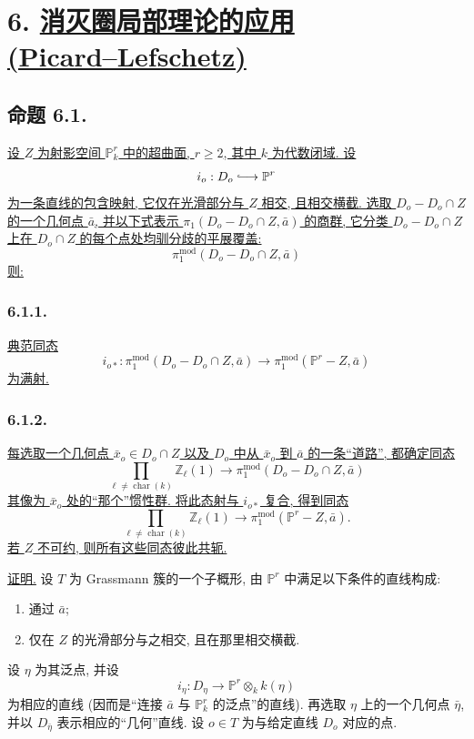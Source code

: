 \section*{6. \underline{消灭圈局部理论的应用}\\
\underline{(Picard--Lefschetz)}}

\subsection*{命题 6.1.}
\underline{设 $Z$ 为射影空间 $\mathbb P^r_k$ 中的超曲面, $r\geq2$, 其中 $k$ 为代数闭域. 设}
\[
i_o:D_o\lhook\joinrel\longrightarrow\mathbb P^r
\]
\underline{为一条直线的包含映射, 它仅在光滑部分与 $Z$ 相交, 且相交横截. 选取 $D_o-D_o\cap Z$ 的一个几何点 $\bar a$, 并以下式表示 $\pi_1(D_o-D_o\cap Z,\bar a)$ 的商群, 它分类 $D_o-D_o\cap Z$ 上在 $D_o\cap Z$ 的每个点处均驯分歧的平展覆盖:}
\[
\pi_1^{\mathrm{mod}}(D_o-D_o\cap Z,\bar a)
\]
\underline{则:}

\subsubsection*{6.1.1.}
\underline{典范同态}
\begin{equation}\tag{6.1.1.1}
i_{o*}:\pi_1^{\mathrm{mod}}(D_o-D_o\cap Z,\bar a)
\longrightarrow
\pi_1^{\mathrm{mod}}(\mathbb P^r-Z,\bar a)
\end{equation}
\underline{为满射.}

\subsubsection*{6.1.2.}
\underline{每选取一个几何点 $\bar x_o\in D_o\cap Z$ 以及 $D_o$ 中从 $\bar x_o$ 到 $\bar a$ 的一条“道路”, 都确定同态}
\begin{equation}\tag{6.1.2.1}
\prod_{\ell\ne\operatorname{char}(k)}\mathbb Z_\ell(1)
\longrightarrow
\pi_1^{\mathrm{mod}}(D_o-D_o\cap Z,\bar a)
\end{equation}
\underline{其像为 $\bar x_o$ 处的“那个”惯性群. 将此态射与 $i_{o*}$ 复合, 得到同态}
\begin{equation}\tag{6.1.2.2}
\prod_{\ell\ne\operatorname{char}(k)}\mathbb Z_\ell(1)
\longrightarrow
\pi_1^{\mathrm{mod}}(\mathbb P^r-Z,\bar a).
\end{equation}
\underline{若 $Z$ 不可约, 则所有这些同态彼此共轭.}

\underline{证明.}
设 $T$ 为 Grassmann 簇的一个子概形, 由 $\mathbb P^r$ 中满足以下条件的直线构成:
\begin{enumerate}[label=(\roman*)]
\item 通过 $\bar a$;
\item 仅在 $Z$ 的光滑部分与之相交, 且在那里相交横截.
\end{enumerate}
设 $\eta$ 为其泛点, 并设
\[
i_\eta:D_\eta\longrightarrow\mathbb P^r\otimes_k k(\eta)
\]
为相应的直线 (因而是“连接 $\bar a$ 与 $\mathbb P^r_k$ 的泛点”的直线). 再选取 $\eta$ 上的一个几何点 $\bar\eta$, 并以 $D_{\bar\eta}$ 表示相应的“几何”直线. 设 $o\in T$ 为与给定直线 $D_o$ 对应的点.
